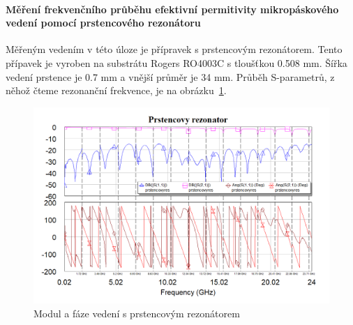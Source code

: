 \documentclass[11pt,a4paper]{article}
\begin{document}
\paragraph*{Měření frekvenčního průběhu efektivní permitivity mikropáskového vedení pomocí prstencového rezonátoru} Měřeným vedením v této úloze je přípravek s prstencovým rezonátorem. Tento přípavek je vyroben na substrátu Rogers RO4003C s tloušťkou 0.508 mm. Šířka vedení prstence je 0.7 mm a vnější průměr je 34 mm. Průběh S-parametrů, z něhož čteme rezonanční frekvence, je na obrázku~\ref{fig:prstencovy-rezonator}.
\begin{figure}[!ht]
\centering
\includegraphics[width=\textwidth]{src/prstencovy-rezonator.png}
\caption{Modul a fáze vedení s prstencovým rezonátorem}
\label{fig:prstencovy-rezonator}
\end{figure}
\end{document}
